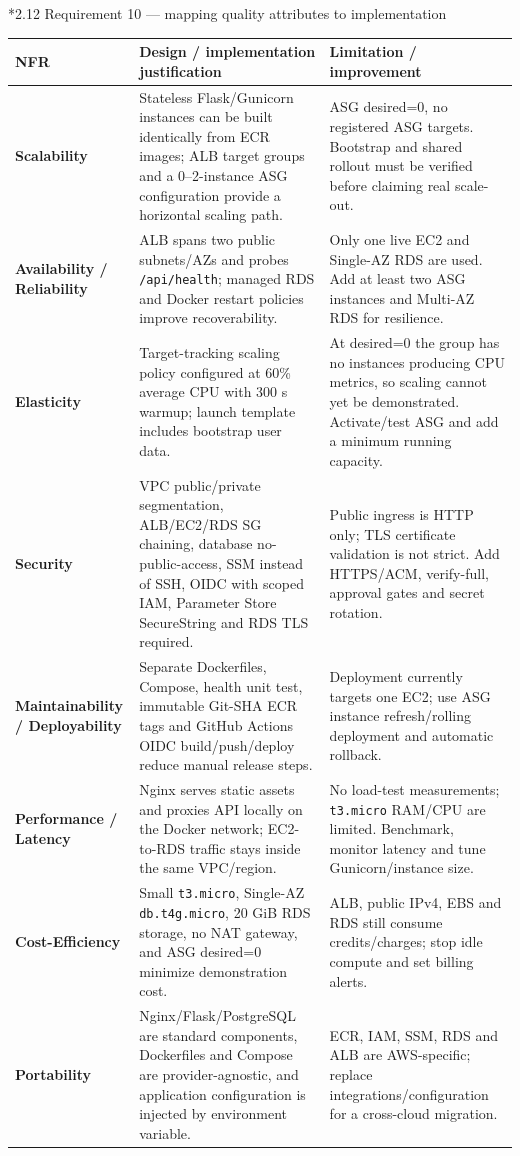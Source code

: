 \documentclass[10pt,a4paper]{article}
\makeatletter
\renewcommand{\subsection}{\@startsection{subsection}{2}{0pt}{7pt}{3pt}{\normalfont\normalsize\bfseries\color{navy}}}
\makeatother
\begin{document}
\subsection*{2.12 Requirement 10 --- mapping quality attributes to implementation}
\footnotesize
\begin{tabularx}{\linewidth}{@{}p{27mm}p{68mm}X@{}}
\toprule
\textbf{NFR} & \textbf{Design / implementation justification} & \textbf{Limitation / improvement}\\
\midrule
\textbf{Scalability} & Stateless Flask/Gunicorn instances can be built identically from ECR images; ALB target groups and a 0--2-instance ASG configuration provide a horizontal scaling path. & ASG desired=0, no registered ASG targets. Bootstrap and shared rollout must be verified before claiming real scale-out.\\
\textbf{Availability / Reliability} & ALB spans two public subnets/AZs and probes \texttt{/api/health}; managed RDS and Docker restart policies improve recoverability. & Only one live EC2 and Single-AZ RDS are used. Add at least two ASG instances and Multi-AZ RDS for resilience.\\
\textbf{Elasticity} & Target-tracking scaling policy configured at 60\% average CPU with 300 s warmup; launch template includes bootstrap user data. & At desired=0 the group has no instances producing CPU metrics, so scaling cannot yet be demonstrated. Activate/test ASG and add a minimum running capacity.\\
\textbf{Security} & VPC public/private segmentation, ALB/EC2/RDS SG chaining, database no-public-access, SSM instead of SSH, OIDC with scoped IAM, Parameter Store SecureString and RDS TLS required. & Public ingress is HTTP only; TLS certificate validation is not strict. Add HTTPS/ACM, verify-full, approval gates and secret rotation.\\
\textbf{Maintainability / Deployability} & Separate Dockerfiles, Compose, health unit test, immutable Git-SHA ECR tags and GitHub Actions OIDC build/push/deploy reduce manual release steps. & Deployment currently targets one EC2; use ASG instance refresh/rolling deployment and automatic rollback.\\
\textbf{Performance / Latency} & Nginx serves static assets and proxies API locally on the Docker network; EC2-to-RDS traffic stays inside the same VPC/region. & No load-test measurements; \texttt{t3.micro} RAM/CPU are limited. Benchmark, monitor latency and tune Gunicorn/instance size.\\
\textbf{Cost-Efficiency} & Small \texttt{t3.micro}, Single-AZ \texttt{db.t4g.micro}, 20 GiB RDS storage, no NAT gateway, and ASG desired=0 minimize demonstration cost. & ALB, public IPv4, EBS and RDS still consume credits/charges; stop idle compute and set billing alerts.\\
\textbf{Portability} & Nginx/Flask/PostgreSQL are standard components, Dockerfiles and Compose are provider-agnostic, and application configuration is injected by environment variable. & ECR, IAM, SSM, RDS and ALB are AWS-specific; replace integrations/configuration for a cross-cloud migration.\\
\bottomrule
\end{tabularx}
\normalsize
\end{document}
